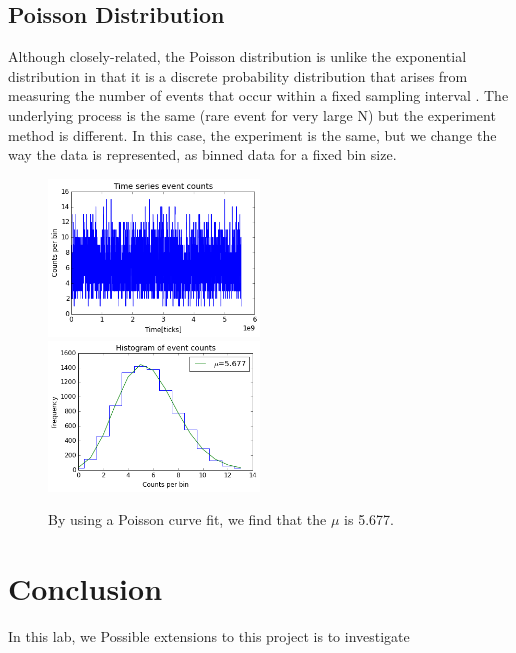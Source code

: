 \documentclass[12pt]{article}
\begin{document}
 	\subsection{Poisson Distribution}
 	Although closely-related, the Poisson distribution is unlike the exponential distribution in that it is a discrete probability distribution that arises from measuring the number of events that occur within a fixed sampling interval . The underlying process is the same (rare event for very large N) but the experiment method is different. In this case, the experiment is the same, but we change the way the data is represented, as binned data for a fixed bin size. 
 	 	\begin{figure}[h]
		\includegraphics[width=0.5\textwidth]{figures/time_series}
		\includegraphics[width=0.5\textwidth]{figures/poisson_histo}
		\caption{By using a Poisson curve fit, we find that the $\mu$ is 5.677.}
		\label{poisson}
	\end{figure}
\section{Conclusion\label{end}}
In this lab, we 
Possible extensions to this project is to investigate 
\end{document}
